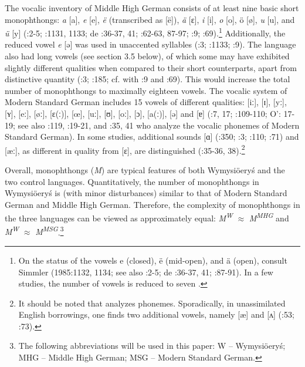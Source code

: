 \documentclass[output=paper]{langscibook}
\begin{document}
The vocalic inventory of Middle High German consists of at least nine basic short monophthongs: \textit{a} [a], \textit{e} [e], \textit{ë} (transcribed as [ë]), \textit{ä} [ɛ], \textit{i} [i], \textit{o} [o], ö [ø], \textit{u} [u], and \textit{ü} [y] (\citealt{Wright1917}:2-5; \citealt{Simmler1985}:1131, 1133; de \citealt{BoorWisniewski1973}:36-37, 41; \citealt{Paul2007}:62-63, 87-97; \citealt{Hall2017}:9; \citealt{Schmidt2017}:69).\footnote{On the status of the vowels e (closed), ë (mid-open), and ä (open), consult Simmler (1985:1132, 1134; see also \citealt{Wright1917}:2-5; de \citealt{BoorWisniewski1973}:36-37, 41; \citealt{Paul2007}:87-91). In a few studies, the number of vowels is reduced to seven \citep[184-185]{Caratini2009}.} Additionally, the reduced vowel \textit{e} [ə] was used in unaccented syllables (\citealt{Wright1917}:3; \citealt{Simmler1985}:1133; \citealt{Hall2017}:9). The language also had long vowels (see section 3.5 below), of which some may have exhibited slightly different qualities when compared to their short counterparts, apart from distinctive quantity (\citealt{Wright1917}:3; \citealt{Caratini2009}:185; cf. with \citealt{Hall2017}:9 and \citealt{Schmidt2017}:69). This would increase the total number of monophthongs to maximally eighteen vowels. The vocalic system of Modern Standard German includes 15 vowels of different qualities: [iː], [ɪ], [yː], [ʏ], [eː], [øː], [ɛ(ː)], [œ], [uː], [ʊ], [oː], [ɔ], [a(ː)], [ə] and [ɐ] (\citealt{Fagan2009}:7, 17; \citealt{JohnsonBraber2008}:109-110; O’\citealt{BrienFagan2016}: 17-19; see also \citealt{Russ1994}:119, \citealt{Wiese1996}:19-21, and \citealt{Fox2005}:35, 41 who analyze the vocalic phonemes of Modern Standard German). In some studies, additional sounds [ɑ] (\citealt{Eisenberg1994}:350; \citealt{DoddEtAl2003}:3; \citealt{JohnsonBraber2008}:110; \citealt{Caratini2009}:71) and [æː], as different in quality from [ɛ], are distinguished (\citealt{Fox2005}:35-36, 38).\footnote{It should be noted that \citet{Fox2005} analyzes phonemes. Sporadically, in unassimilated English borrowings, one finds two additional vowels, namely [æ] and [ʌ] (\citealt{Fox2005}:53; \citealt{Caratini2009}:73).} 



Overall, monophthongs (\textit{M}) are typical features of both Wymysiöeryś and the two control languages. Quantitatively, the number of monophthongs in Wymysiöeryś is (with minor disturbances) similar to that of Modern Standard German and Middle High German. Therefore, the complexity of monophthongs in the three languages can be viewed as approximately equal: \textit{M\textsuperscript{W}} ${\approx}$ \textit{M\textsuperscript{MHG} }and \textit{M\textsuperscript{W}} ${\approx}$ \textit{M\textsuperscript{MSG}}.\footnote{The following abbreviations will be used in this paper: W – Wymysiöeryś; MHG – Middle High German; MSG – Modern Standard German.}
\end{document}
